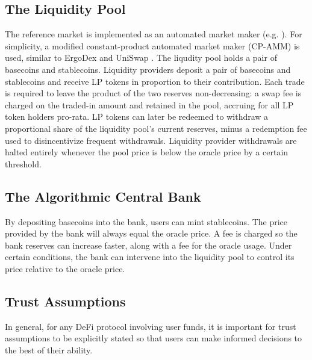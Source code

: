\documentclass{ifcolog}
\begin{document}

\subsection{The Liquidity Pool}
\label{subsec:pool}

The reference market is implemented as an automated market maker (e.g. \cite{xu2021sok}). 
For simplicity, a modified constant-product automated market maker (CP-AMM) is used, 
similar to ErgoDex \cite{ErgoDex} and UniSwap \cite{Uniswap}. The liqudity pool holds a pair of 
basecoins and stablecoins. Liquidity providers deposit a pair of basecoins 
and stablecoins and receive LP tokens in proportion to their contribution. 
Each trade is required to leave the product of the two reserves non-decreasing: 
a swap fee is charged on the traded-in amount and retained in the pool, accruing 
for all LP token holders pro-rata. LP tokens can later be redeemed to withdraw a 
proportional share of the liquidity pool's current reserves, 
minus a redemption fee used to disincentivize frequent withdrawals.
Liquidity provider withdrawals are halted entirely whenever the pool price is 
below the oracle price by a certain threshold.


\subsection{The Algorithmic Central Bank}
\label{subscec:bank}

By depositing basecoins into the bank, users can mint stablecoins. 
The price provided by the bank will always equal the oracle price. 
A fee is charged so the bank reserves can increase faster, along with a fee for the oracle usage.
Under certain conditions, the bank can intervene into the liquidity pool to control its price relative to the oracle price.



\subsection{Trust Assumptions}
\label{subsec:kya}

In general, for any DeFi protocol involving user funds, it is important for trust assumptions to be explicitly stated so 
that users can make informed decisions to the best of their ability.
\end{document}
